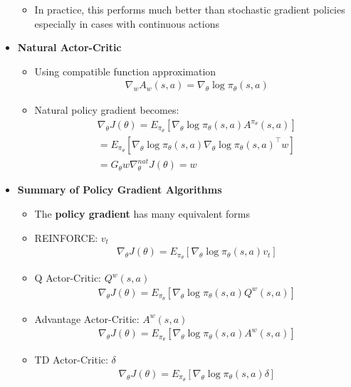 \documentclass[12pt]{article}
\begin{document}
\begin{itemize}
\begin{itemize}
    \item In practice, this performs much better than stochastic gradient policies especially in cases with continuous actions
  \end{itemize}
  \item \textbf{Natural Actor-Critic}
  \begin{itemize}
    \item Using compatible function approximation
    \begin{gather*}
      \nabla_w A_w (s,a) = \nabla_\theta \log \pi_\theta (s,a)
    \end{gather*}
    \item Natural policy gradient becomes:
    \begin{gather*}
      \nabla_\theta J(\theta) = E_{\pi_\theta}[\nabla_\theta \log \pi_\theta (s,a) A^{\pi_\theta}(s,a)] \\
      = E_{\pi_\theta}[\nabla_\theta \log \pi_\theta (s,a) \nabla_\theta \log \pi_\theta (s,a)^\top w] \\
      = G_\theta w
      \nabla_\theta^{nat} J(\theta) = w
    \end{gather*}
  \end{itemize}
  \item \textbf{Summary of Policy Gradient Algorithms}
  \begin{itemize}
    \item The \textbf{policy gradient} has many equivalent forms
    \item REINFORCE: $v_t$
    \begin{gather*}
      \nabla_\theta J(\theta) = E_{\pi_\theta}[\nabla_\theta \log \pi_\theta (s, a) v_t]
    \end{gather*}
    \item Q Actor-Critic: $Q^w(s,a)$
    \begin{gather*}
      \nabla_\theta J(\theta) = E_{\pi_\theta}[\nabla_\theta \log \pi_\theta (s, a) Q^w(s,a)]
    \end{gather*}
    \item Advantage Actor-Critic: $A^w(s,a)$
    \begin{gather*}
      \nabla_\theta J(\theta) = E_{\pi_\theta}[\nabla_\theta \log \pi_\theta (s, a) A^w(s,a)]
    \end{gather*}
    \item TD Actor-Critic: $\delta$
    \begin{gather*}
      \nabla_\theta J(\theta) = E_{\pi_\theta}[\nabla_\theta \log \pi_\theta (s, a) \delta]
    \end{gather*}

\end{itemize}
\end{itemize}
\end{document}
